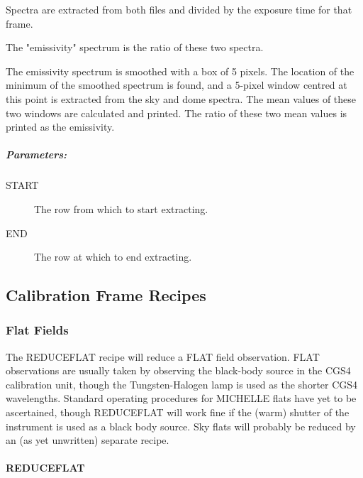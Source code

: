 \documentclass[twoside,11pt]{article}
\renewcommand{\_}{\texttt{\symbol{95}}}
\begin{document}
Spectra are extracted from both files and divided by the exposure time
for that frame.



The "emissivity" spectrum is the ratio of these two spectra.



The emissivity spectrum is smoothed with a box of 5 pixels.  The
location of the minimum of the smoothed spectrum is found, and a
5-pixel window centred at this point is extracted from the sky and
dome spectra.  The mean values of these two windows are calculated and
printed.  The ratio of these two mean values is printed as the
emissivity.

\subparagraph*{Parameters:\label{_EMISSIVITY_--_Calculates_Telescope_Emissivity_PARAMETERS}}

\begin{description}
\item[START]  The row from which to start extracting.

\item[END]  The row at which to end extracting.

\end{description}

\subsection{Calibration Frame Recipes}

\subsubsection{Flat Fields}

The REDUCE\_FLAT recipe will reduce a FLAT field observation. FLAT
observations are usually taken by observing the black-body source in
the CGS4 calibration unit, though the Tungsten-Halogen lamp is used as
the shorter CGS4 wavelengths. Standard operating procedures for
MICHELLE flats have yet to be ascertained, though REDUCE\_FLAT will
work fine if the (warm) shutter of the instrument is used as a black
body source. Sky flats will probably be reduced by an (as yet
unwritten) separate recipe.

\paragraph*{REDUCE\_FLAT\label{REDUCE_FLAT}}
\end{document}
